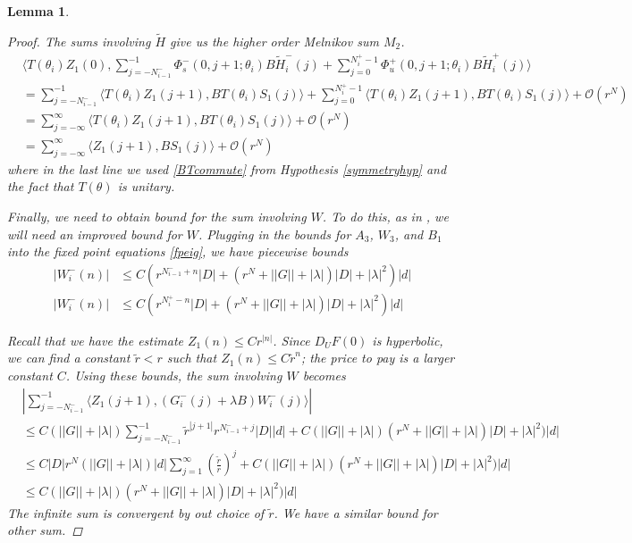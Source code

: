 \documentclass[12pt]{article}
\newtheorem{lemma}{Lemma}
\begin{document}
\begin{lemma}
\begin{proof}
The sums involving $\tilde{H}$ give us the higher order Melnikov sum $M_2$.
\begin{align*}
&\langle T(\theta_i) Z_1(0), \sum_{j = -N_{i-1}^-}^{-1} \Phi_s^-(0, j+1; \theta_i) B \tilde{H}_i^-(j) + \sum_{j = 0}^{N_i^+-1} \Phi_u^+(0, j+1; \theta_i) B \tilde{H}_i^+(j) \rangle \\
&= \sum_{j = -N_{i-1}^-}^{-1} \langle T(\theta_i) Z_1(j+1), B T(\theta_i) S_1(j) \rangle + \sum_{j = 0}^{N_i^+-1} \langle T(\theta_i) Z_1(j+1), B T(\theta_i) S_1(j) \rangle + \mathcal{O}(r^N)\\
&= \sum_{j = -\infty}^{\infty} \langle T(\theta_i) Z_1(j+1), B T(\theta_i) S_1(j)\rangle + \mathcal{O}(r^N) \\
&= \sum_{j = -\infty}^{\infty} \langle Z_1(j+1), B S_1(j)\rangle + \mathcal{O}(r^N)
\end{align*}
where in the last line we used \eqref{BTcommute} from Hypothesis \ref{symmetryhyp} and the fact that $T(\theta)$ is unitary.

Finally, we need to obtain bound for the sum involving $W$. To do this, as in \cite{Sandstede1998}, we will need an improved bound for $W$. Plugging in the bounds for $A_3$, $W_3$, and $B_1$ into the fixed point equations \eqref{fpeig}, we have piecewise bounds
\begin{align*}
|W_i^-(n)| &\leq C( r^{N_{i-1}^- + n}|D| +  
(r^N + ||G|| + |\lambda|)|D| + |\lambda|^2 )|d| \\
|W_i^-(n)| &\leq C( r^{N_i^+ - n}|D| +  
(r^N + ||G|| + |\lambda|)|D| + |\lambda|^2 )|d|
\end{align*}

Recall that we have the estimate $Z_1(n) \leq C r^{|n|}$. Since $D_U F(0)$ is hyperbolic, we can find a constant $\tilde{r} < r$ such that $Z_1(n) \leq C \tilde{r}^n$; the price to pay is a larger constant $C$. Using these bounds, the sum involving $W$ becomes
\begin{align*}
&\left| \sum_{j = -N_{i-1}^-}^{-1} \langle Z_1(j+1), 
(G_i^-(j) + \lambda B) W_i^-(j) \rangle \right| \\
&\leq C (||G|| + |\lambda|) \sum_{j = -N_{i-1}^-}^{-1} \tilde{r}^{|j+1|} r^{N_{i-1}^- + j}|D||d| + C (||G|| + |\lambda|)(r^N + ||G|| + |\lambda|)|D| + |\lambda|^2 )|d| \\
&\leq C |D| r^N (||G|| + |\lambda|)|d| \sum_{j = 1}^\infty \left( \frac{\tilde{r}}{r}\right)^j + C (||G|| + |\lambda|)(r^N + ||G|| + |\lambda|)|D| + |\lambda|^2 )|d| \\
&\leq C (||G|| + |\lambda|)(r^N + ||G|| + |\lambda|)|D| + |\lambda|^2 )|d|
\end{align*}
The infinite sum is convergent by out choice of $\tilde{r}$. We have a similar bound for other sum.


\end{proof}
\end{lemma}
\end{document}
